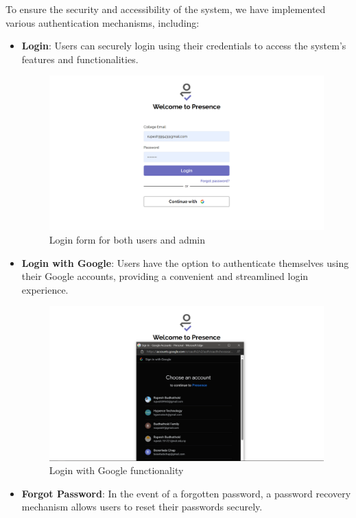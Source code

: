 To ensure the security and accessibility of the system, we have implemented various authentication mechanisms, including:
\begin{itemize} 
\item \textbf{Login}: Users can securely login using their credentials to access the system's features and functionalities.
\begin{figure}[H]
    \includegraphics[width=\linewidth]{figures/login.png}
    \centering
    \caption{Login form for both users and admin}
\end{figure}
\item \textbf{Login with Google}: Users have the option to authenticate themselves using their Google accounts, providing a convenient and streamlined login experience.
\begin{figure}[H]
    \includegraphics[width=\linewidth]{figures/login-with-google.png}
    \centering
    \caption{Login with Google functionality}
\end{figure}
\item \textbf{Forgot Password}: In the event of a forgotten password, a password recovery mechanism allows users to reset their passwords securely.

\end{itemize}
